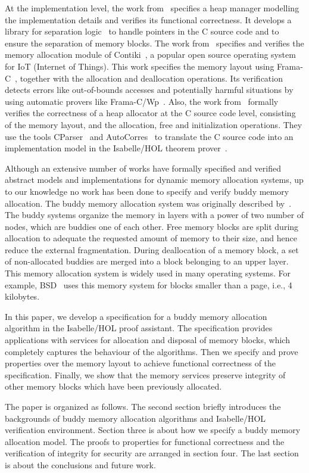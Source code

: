 At the implementation level, the work from~\cite{reg_marti} specifies a heap manager modelling the implementation details and verifies its functional correctness. It develops a library for separation logic~\cite{reg_reynolds} to handle pointers in the C source code and to ensure the separation of memory blocks. The work from~\cite{reg_mangano} specifies and verifies the memory allocation module of Contiki~\cite{reg_dunkers}, a popular open source operating system for IoT (Internet of Things). This work specifies the memory layout using Frama-C~\cite{reg_kirchner}, together with the allocation and deallocation operations. Its verification detects errors like out-of-bounds accesses and potentially harmful situations by using automatic provers like Frama-C/Wp~\cite{reg_allan}. Also, the work from~\cite{reg_sahebolamri} formally verifies the correctness of a heap allocator at the C source code level, consisting of the memory layout, and the allocation, free and initialization operations. They use the tools CParser~\cite{reg_tuch} and AutoCorres~\cite{reg_greenaway} to translate the C source code into an implementation model in the Isabelle/HOL theorem prover~\cite{reg_Isabelle/HOL}.

Although an extensive number of works have formally specified and verified abstract models and implementations for dynamic memory allocation systems, up to our knowledge no work has been done to specify and verify buddy memory allocation. The buddy memory allocation system was originally described by~\cite{reg_knowlton}. The buddy systems organize the memory in layers with a power of two number of nodes, which are buddies one of each other. Free memory blocks are split during allocation to adequate the requested amount of memory to their size, and hence reduce the external fragmentation. During deallocation of a memory block, a set of non-allocated buddies are merged into a block belonging to an upper layer. This memory allocation system is widely used in many operating systems. For example, BSD~\cite{reg_mckusick} uses this memory system for blocks smaller than a page, i.e., 4 kilobytes.

In this paper, we develop a specification for a buddy memory allocation algorithm in the Isabelle/HOL proof assistant. The specification provides applications with services for allocation and disposal of memory blocks, which completely captures the behaviour of the algorithms. Then we specify and prove properties  over the memory layout to achieve functional correctness of the specification. Finally, we show that the memory services preserve integrity of other memory blocks which have been previously allocated.

The paper is organized as follows. The second section briefly introduces the backgrounds of buddy memory allocation algorithms and Isabelle/HOL verification environment. Section three is about how we specify a buddy memory allocation model. The proofs to properties for functional correctness and the verification of integrity for security are arranged in section four. The last section is about the conclusions and future work.

